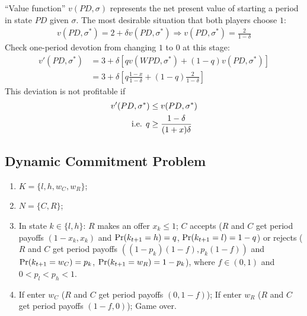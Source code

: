 \documentclass[11pt]{elegantbook}
\begin{document}
``Value function'' $v(PD,\sigma)$ represents the net present value of starting a period in state $PD$ given $\sigma$. The most desirable situation that both players choose $1$:
\begin{equation}
    \begin{aligned}
        v(PD,\sigma^*)=2+\delta v(PD,\sigma^*) \Rightarrow v(PD,\sigma^*)=\frac{2}{1-\delta}
    \end{aligned}
    \nonumber
\end{equation}
Check one-period devotion from changing $1$ to $0$ at this stage:
\begin{equation}
    \begin{aligned}
        v'(PD,\sigma^*)&=3+\delta\left[q v(WPD,\sigma^*) + (1-q)v(PD,\sigma^*)\right]\\
        &=3+\delta\left[q\frac{1-x}{1-\delta}+(1-q)\frac{2}{1-\delta}\right]
    \end{aligned}
    \nonumber
\end{equation}
This deviation is not profitable if
\begin{equation}
    \begin{aligned}
        v'(PD,\sigma^*)&\leq v(PD,\sigma^*)\\
        \textnormal{i.e. } q&\geq \frac{1-\delta}{(1+x)\delta}
    \end{aligned}
    \nonumber
\end{equation}


\subsection{Dynamic Commitment Problem}
\begin{enumerate}
    \item $K=\{l,h,w_C,w_R\}$;
    \item $N=\{C,R\}$;
    \item In state $k\in \{l,h\}$:
    \subitem $R$ makes an offer $x_k\leq 1$;
    \subitem $C$ accepts ($R$ and $C$ get period payoffs $(1-x_k,x_k)$ and $\textnormal{Pr}(k_{t+1}=h)=q$, $\textnormal{Pr}(k_{t+1}=l)=1-q$) or rejects ($R$ and $C$ get period payoffs $((1-p_k)(1-f),p_k(1-f))$ and $\textnormal{Pr}(k_{t+1}=w_C)=p_k$, $\textnormal{Pr}(k_{t+1}=w_R)=1-p_k$), where $f\in (0,1)$ and $0<p_l<p_h<1$.
    \item If enter $w_C$ ($R$ and $C$ get period payoffs $(0,1-f)$); If enter $w_R$ ($R$ and $C$ get period payoffs $(1-f,0)$); Game over.
\end{enumerate}
\end{document}
